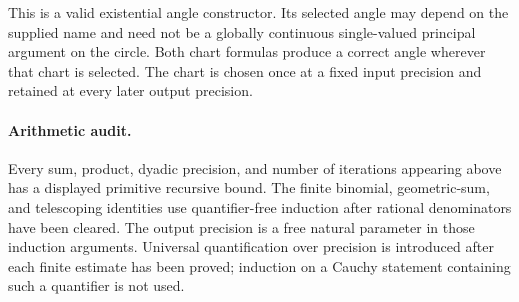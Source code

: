 This is a valid existential angle constructor.  Its selected angle may
depend on the supplied name and need not be a globally continuous
single-valued principal argument on the circle.  Both chart formulas
produce a correct angle wherever that chart is selected.  The chart is
chosen once at a fixed input precision and retained at every later
output precision.

\paragraph{Arithmetic audit.}
Every sum, product, dyadic precision, and number of iterations appearing
above has a displayed primitive recursive bound.  The finite binomial,
geometric-sum, and telescoping identities use quantifier-free induction
after rational denominators have been cleared.  The output precision is
a free natural parameter in those induction arguments.  Universal
quantification over precision is introduced after each finite estimate
has been proved; induction on a Cauchy statement containing such a
quantifier is not used.
